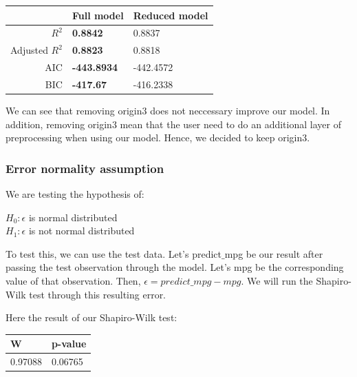 \begin{table}[H]
\centering
{}
\begin{tabular}{rll}
  \hline
               & Full model             & Reduced model    \\
    \hline
$R^2$          & \textbf{0.8842}    & 0.8837    \\
Adjusted $R^2$ & \textbf{0.8823}    & 0.8818    \\
AIC            & \textbf{-443.8934} & -442.4572 \\
BIC            & \textbf{-417.67}   & -416.2338 \\
   \hline
\end{tabular}
\label{tab:vif}
\end{table}

We can see that removing origin3 does not neccessary improve our model. In addition, removing origin3 mean that the user need to do an additional layer of preprocessing when using our model. Hence, we decided to keep origin3.

\subsubsection{Error normality assumption}

We are testing the hypothesis of:

\begin{center}
    $H_0: \epsilon$ is normal distributed
    \\
    $H_1:\epsilon$ is not normal distributed
\end{center}

To test this, we can use the test data. Let's predict$\_$mpg be our result after passing the test observation through the model. Let's mpg be the corresponding value of that observation. Then, $\epsilon = predict\_mpg - mpg$. We will run the Shapiro-Wilk test through this resulting error.

Here the result of our Shapiro-Wilk test:

\begin{table}[H]
\centering
{}
\begin{tabular}{ll}
  \hline
                W             & p-value    \\
    \hline
        0.97088    & 0.06765   \\

   \hline
\end{tabular}
\label{tab:vif}
\end{table}


